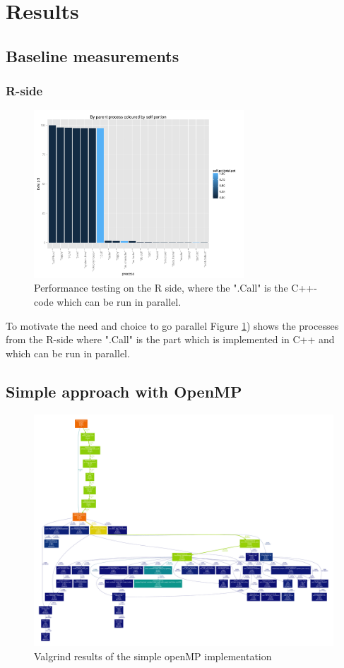 \section{Results}

\subsection{Baseline measurements}

\subsubsection{R-side}

\begin{figure}[!htbp]
  \centering
  \includegraphics[width=0.7\textwidth]{images/parentColByPortion.pdf}
  \caption{Performance testing on the R side, where the ".Call" is
    the C++-code which can be run in parallel.}
  \label{fig:Rself}
\end{figure}

To motivate the need and choice to go parallel Figure \ref{fig:Rself})
shows the processes from the R-side where ".Call" is the part
which is implemented in C++ and which can be run in parallel.

\subsection{Simple approach with OpenMP}

\begin{figure}[!htbp]
  \centering
  \includegraphics[height=0.75\textheight, angle=90]{images/profOpenMPSimple.pdf}
  \caption{Valgrind results of the simple openMP implementation}
  \label{fig:simpleOpenMP}
\end{figure}



